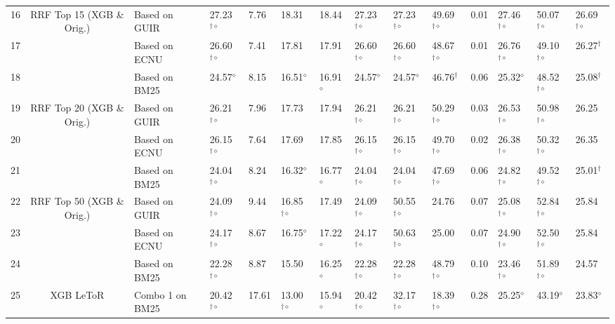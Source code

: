\begin{table*}
{\begin{tabular}{ccllllllllllll}
\midrule 
16  & \multirow{3}{*}{RRF Top 15 (XGB \& Orig.) }  & Based on GUIR  & 27.23$^{\dagger\diamond}$  & 7.76  & 18.31  & 18.44  & 27.23$^{\dagger\diamond}$  & 27.23$^{\dagger\diamond}$  & 49.69$^{\dagger\diamond}$  & 0.01  & 27.46$^{\dagger\diamond}$  & 50.07$^{\dagger\diamond}$  & 26.69$^{\dagger\diamond}$\tabularnewline
17  &  & Based on ECNU  & 26.60$^{\dagger\diamond}$  & 7.41  & 17.81  & 17.91  & 26.60$^{\dagger\diamond}$  & 26.60$^{\dagger\diamond}$  & 48.67$^{\dagger\diamond}$  & 0.01  & 26.76$^{\dagger\diamond}$  & 49.10$^{\dagger\diamond}$  & 26.27$^{\dagger}$ \tabularnewline
18  &  & Based on BM25  & 24.57$^{\diamond}$  & 8.15  & 16.51$^{\diamond}$  & 16.91$^{\diamond}$  & 24.57$^{\diamond}$  & 24.57$^{\diamond}$  & 46.76$^{\dagger}$  & 0.06  & 25.32$^{\diamond}$  & 48.52$^{\dagger\diamond}$  & 25.08$^{\dagger}$ \tabularnewline
\midrule 
19  & \multirow{3}{*}{RRF Top 20 (XGB \& Orig.)}  & Based on GUIR  & 26.21$^{\dagger\diamond}$  & 7.96  & 17.73  & 17.94  & 26.21$^{\dagger\diamond}$  & 26.21$^{\dagger\diamond}$  & 50.29$^{\dagger\diamond}$  & 0.03  & 26.53$^{\dagger\diamond}$  & 50.98$^{\dagger\diamond}$  & 26.25\tabularnewline
20  &  & Based on ECNU  & 26.15$^{\dagger\diamond}$  & 7.64  & 17.69  & 17.85  & 26.15$^{\dagger\diamond}$  & 26.15$^{\dagger\diamond}$  & 49.70$^{\dagger\diamond}$  & 0.02  & 26.38$^{\dagger\diamond}$  & 50.32$^{\dagger\diamond}$  & 26.35\tabularnewline
21  &  & Based on BM25  & 24.04$^{\dagger\diamond}$  & 8.24  & 16.32$^{\diamond}$  & 16.77$^{\diamond}$  & 24.04$^{\dagger\diamond}$  & 24.04$^{\dagger\diamond}$  & 47.69$^{\dagger\diamond}$  & 0.06  & 24.82$^{\dagger\diamond}$  & 49.52$^{\dagger\diamond}$  & 25.01$^{\dagger}$ \tabularnewline
\midrule 
22  & \multirow{3}{*}{RRF Top 50 (XGB \& Orig.)}  & Based on GUIR  & 24.09$^{\dagger\diamond}$  & 9.44  & 16.85$^{\dagger\diamond}$  & 17.49  & 24.09$^{\dagger\diamond}$  & 50.55$^{\dagger\diamond}$  & 24.76  & 0.07  & 25.08$^{\dagger\diamond}$  & 52.84$^{\dagger\diamond}$  & 25.84\tabularnewline
23  &  & Based on ECNU  & 24.17$^{\dagger\diamond}$  & 8.67  & 16.75$^{\diamond}$  & 17.22$^{\diamond}$  & 24.17$^{\dagger\diamond}$  & 50.63$^{\dagger\diamond}$  & 25.00  & 0.07  & 24.90$^{\dagger\diamond}$  & 52.50$^{\dagger\diamond}$  & 25.84 \tabularnewline
24  &  & Based on BM25  & 22.28$^{\dagger\diamond}$  & 8.87  & 15.50  & 16.25$^{\diamond}$  & 22.28$^{\dagger\diamond}$  & 22.28$^{\dagger\diamond}$  & 48.79$^{\dagger\diamond}$  & 0.10  & 23.46$^{\dagger\diamond}$  & 51.89$^{\dagger\diamond}$  & 24.57\tabularnewline
\midrule 
25  & \multirow{5}{*}{XGB LeToR}  & Combo 1 on BM25  & 20.42$^{\dagger\diamond}$  & 17.61  & 13.00$^{\dagger\diamond}$  & 15.94$^{\diamond}$  & 20.42$^{\dagger\diamond}$  & 32.17$^{\dagger\diamond}$  & 18.39$^{\dagger\diamond}$  & 0.28  & 25.25$^{\diamond}$  & 43.19$^{\diamond}$  & 23.83$^{\diamond}$\tabularnewline

\end{tabular}}
\end{table*}
